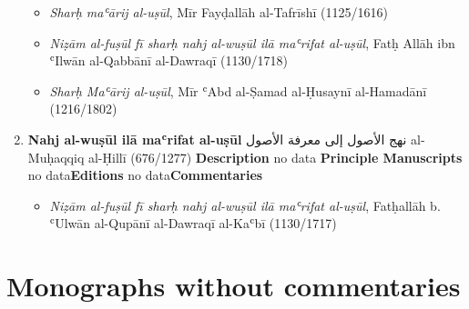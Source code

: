 \documentclass{article}
\begin{document}
\begin{enumerate}
\begin{itemize}
              \item \emph{Sharḥ maʿārij al-uṣūl}, Mīr Fayḍallāh al-Tafrīshī (1125/1616)
            
              \item \emph{Niẓām al-fuṣūl fī sharḥ nahj al-wuṣūl ilā maʿrifat al-uṣūl}, Fatḥ Allāh ibn ʿIlwān al-Qabbānī al-Dawraqī (1130/1718)
            
              \item \emph{Sharḥ Maʿārij al-uṣūl}, Mīr ʿAbd al-Ṣamad al-Ḥusaynī al-Hamadānī (1216/1802)
            \end{itemize}

      \item \textbf{Nahj al-wuṣūl ilā maʿrifat al-uṣūl}
        \newline
        \textarabic{نهج الأصول إلى معرفة الأصول}
        \newline
        al-Muḥaqqiq al-Ḥillī
        \newline
        (676/1277)
        \newline
        \newline
        \textbf{Description}
        \newline	
        no data
        \newline
        \newline
    \textbf{Principle Manuscripts}
\newline
no data\newline\textbf{Editions}
\newline
no data\newline\textbf{Commentaries}
\begin{itemize}
              \item \emph{Niẓām al-fuṣūl fī sharḥ nahj al-wuṣūl ilā maʿrifat al-uṣūl}, Fatḥallāh b. ʿUlwān al-Qupānī al-Dawraqī al-Kaʿbī (1130/1717)
            \end{itemize}
\end{enumerate}\section{Monographs without commentaries}
\end{document}
